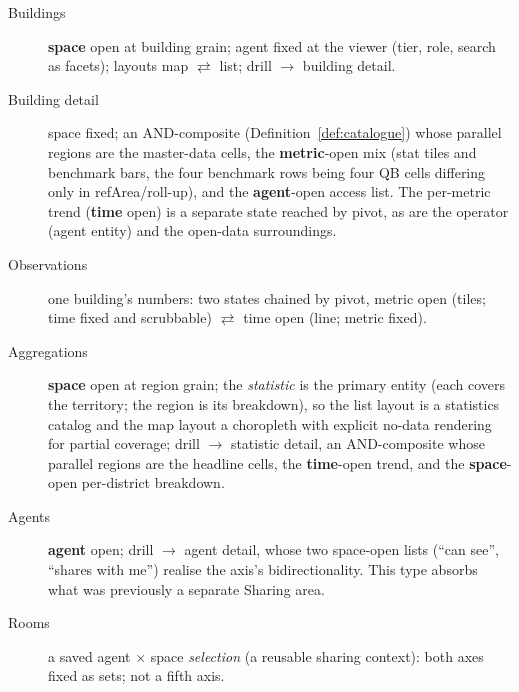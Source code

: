 \documentclass[11pt,a4paper]{article}
\theoremstyle{remark}
\begin{document}
\begin{description}
\item[Buildings] \textbf{space} open at building grain; agent fixed at the viewer
  (tier, role, search as facets); layouts map $\rightleftarrows$ list; drill
  $\to$ building detail.
\item[Building detail] space fixed; an AND-composite
  (Definition~\ref{def:catalogue}) whose parallel regions are the master-data
  cells, the \textbf{metric}-open mix (stat tiles and benchmark bars, the four
  benchmark rows being four QB cells differing only in refArea/roll-up), and the
  \textbf{agent}-open access list. The per-metric trend (\textbf{time} open) is
  a separate state reached by pivot, as are the operator (agent entity) and the
  open-data surroundings.
\item[Observations] one building's numbers: two states chained by pivot,
  metric open (tiles; time fixed and scrubbable) $\rightleftarrows$ time open
  (line; metric fixed).
\item[Aggregations] \textbf{space} open at region grain; the \emph{statistic} is
  the primary entity (each covers the territory; the region is its breakdown), so
  the list layout is a statistics catalog and the map layout a choropleth with
  explicit no-data rendering for partial coverage; drill $\to$ statistic detail,
  an AND-composite whose parallel regions are the headline cells, the
  \textbf{time}-open trend, and the \textbf{space}-open per-district breakdown.
\item[Agents] \textbf{agent} open; drill $\to$ agent detail, whose two space-open
  lists (``can see'', ``shares with me'') realise the axis's bidirectionality.
  This type absorbs what was previously a separate Sharing area.
\item[Rooms] a saved agent $\times$ space \emph{selection} (a reusable sharing
  context): both axes fixed as sets; not a fifth axis.
\end{description}
\end{document}
